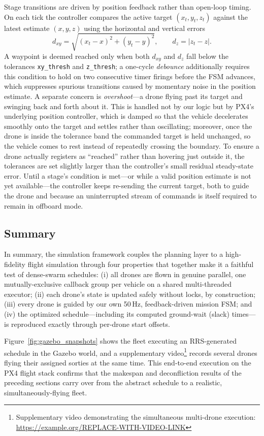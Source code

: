 \documentclass[subscriptcorrection,upint,nolists, varvw,barcolor=Goldenrod3,mathalfa=cal=euler,balance,hyphenate,french]{asmejour} %
\begin{document}
Stage transitions are driven by position feedback rather than open-loop timing. On each tick the controller compares the active target $(x_t,y_t,z_t)$ against the latest estimate $(x,y,z)$ using the horizontal and vertical errors
\[ d_{xy}=\sqrt{(x_t-x)^2+(y_t-y)^2}, \qquad d_z=\lvert z_t-z\rvert .\]
A waypoint is deemed reached only when both $d_{xy}$ and $d_z$ fall below the tolerances \texttt{xy\_thresh} and \texttt{z\_thresh}; a one-cycle \emph{debounce} additionally requires this condition to hold on two consecutive timer firings before the FSM advances, which suppresses spurious transitions caused by momentary noise in the position estimate. A separate concern is \emph{overshoot}---a drone flying past its target and swinging back and forth about it. This is handled not by our logic but by PX4's underlying position controller, which is damped so that the vehicle decelerates smoothly onto the target and settles rather than oscillating; moreover, once the drone is inside the tolerance band the commanded target is held unchanged, so the vehicle comes to rest instead of repeatedly crossing the boundary. To ensure a drone actually registers as ``reached'' rather than hovering just outside it, the tolerances are set slightly larger than the controller's small residual steady-state error. Until a stage's condition is met---or while a valid position estimate is not yet available---the controller keeps re-sending the current target, both to guide the drone and because an uninterrupted stream of commands is itself required to remain in offboard mode.

\subsection{Summary}

In summary, the simulation framework couples the planning layer to a high-fidelity flight simulation through four properties that together make it a faithful test of dense-swarm schedules: (i) all drones are flown in genuine parallel, one mutually-exclusive callback group per vehicle on a shared multi-threaded executor; (ii) each drone's state is updated safely without locks, by construction; (iii) every drone is guided by our own 50\,Hz, feedback-driven mission FSM; and (iv) the optimized schedule---including its computed ground-wait (slack) times---is reproduced exactly through per-drone start offsets.

Figure~\ref{fig:gazebo_snapshots} shows the fleet executing an RRS-generated schedule in the Gazebo world, and a supplementary video\footnote{Supplementary video demonstrating the simultaneous multi-drone execution: \url{https://example.org/REPLACE-WITH-VIDEO-LINK}} records several drones flying their assigned sorties at the same time. This end-to-end execution on the PX4 flight stack confirms that the makespan and deconfliction results of the preceding sections carry over from the abstract schedule to a realistic, simultaneously-flying fleet.
\end{document}
